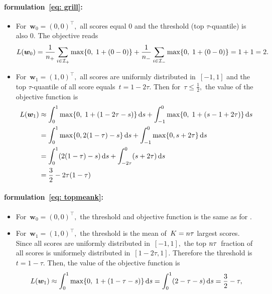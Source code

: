 \paragraph*{\Grill formulation~\eqref{eq: grill}:}
\begin{itemize}
  \item For~$\bm{w}_0 = (0,0)^{\top},$ all scores equal 0 and the threshold (top $\tau$-quantile) is also 0. The objective reads
  \begin{equation*}
    L(\bm{w}_0)
      = \frac{1}{\npos} \sum_{i \in \Ipos} \max\Brac[c]{0, \; 1 + (0 - 0)} + \frac{1}{\nneg} \sum_{i \in \Ineg} \max\Brac[c]{0, \; 1 + (0 - 0)}
      = 1 + 1
      = 2.
  \end{equation*}
  \item For~$\bm{w}_1 = (1,0)^{\top},$ all scores are uniformly distributed in~$[-1,1]$ and the top $\tau$-quantile of all score equals~$t = 1-2\tau.$ Then for~$\tau \leq \frac{1}{2},$ the value of the objective function is
  \begin{align*}
    L(\bm{w}_1)
      & \approx \int_{0}^{1} \max\Brac[c]{0, \; 1 + \Brac{1-2\tau - s}} \dd{s} + \int_{-1}^{0} \max\Brac[c]{0, \; 1 + \Brac{s - 1 + 2\tau}} \dd{s} \\
      & = \int_{0}^{1} \max\Brac[c]{0, 2(1 - \tau) - s} \dd{s} + \int_{-1}^{0} \max\Brac[c]{0, s + 2\tau} \dd{s} \\
      & = \int_{0}^{1} \Brac{2(1 - \tau) - s} \dd{s} + \int_{-2\tau}^{0} \Brac{s + 2\tau} \dd{s} \\
      & = \frac{3}{2} - 2\tau(1 - \tau)
  \end{align*}
\end{itemize}

\paragraph*{\TopMeanK formulation~\eqref{eq: topmeank}:}
\begin{itemize}
  \item For~$\bm{w}_0 = (0,0)^{\top},$ the threshold and objective function is the same as for \TopPushK.
  \item For~$\bm{w}_1 = (1,0)^{\top},$ the threshold is the mean of~$K = n \tau$ largest scores. Since all scores are uniformly distributed in~$[-1, 1],$ the top $n \tau$~fraction of all scores is uniformely distributed in~$[1 - 2\tau, 1].$ Therefore the threshold is~$t = 1 - \tau.$ Then, the value of the objective function is
  \begin{equation*}
    L(\bm{w}_1)
      \approx \int_{0}^{1} \max\Brac[c]{0, \; 1 + \Brac{1 - \tau - s}} \dd{s}
      = \int_{0}^{1} \Brac{2 - \tau - s} \dd{s}
      = \frac{3}{2} - \tau,
  \end{equation*}
\end{itemize}

